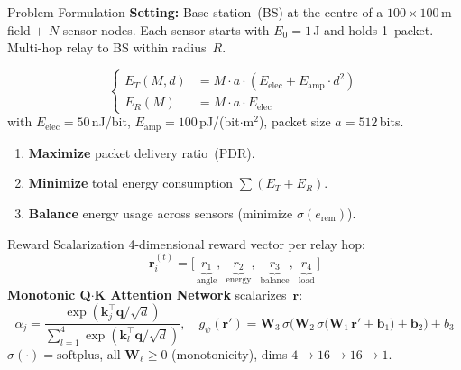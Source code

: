 \documentclass[final]{beamer}
\newlength{\colwidth}
\begin{document}
\begin{frame}[t]
\begin{columns}[t]
\begin{column}{\colwidth}
  \begin{block}{Problem Formulation}
    \textbf{Setting:} Base station~(BS) at the centre of a $100\!\times\!100$\,m field $+$ $N$ sensor nodes.
    Each sensor starts with $E_0=1$\,J and holds 1~packet.  Multi-hop relay to BS within radius~$R$.

    \begin{equation*}
    \left\{
    \begin{aligned}
      E_T(M,d) &= M \cdot a \cdot (E_{\text{elec}} + E_{\text{amp}} \cdot d^2) \\
      E_R(M) &= M \cdot a \cdot E_{\text{elec}}
    \end{aligned}
    \right.
    \end{equation*}
    with $E_{\text{elec}}=50$\,nJ/bit, $E_{\text{amp}}=100$\,pJ/(bit$\cdot$m$^2$), packet size $a=512$\,bits.

    \begin{enumerate}
      \item \textbf{Maximize} packet delivery ratio~(PDR).
      \item \textbf{Minimize} total energy consumption $\sum (E_T + E_R)$.
      \item \textbf{Balance} energy usage across sensors (minimize $\sigma(e_{\text{rem}})$).
    \end{enumerate}
  \end{block}

  \begin{block}{Reward Scalarization}
    4-dimensional reward vector per relay hop:
    \begin{equation*}
      \mathbf{r}_i^{(t)} = \bigl[\,\underbrace{r_1}_{\text{angle}},\;\underbrace{r_2}_{\text{energy}},\;\underbrace{r_3}_{\text{balance}},\;\underbrace{r_4}_{\text{load}}\,\bigr]
    \end{equation*}
    \textbf{Monotonic Q$\cdot$K Attention Network} scalarizes~$\mathbf{r}$:
    \begin{equation*}
      \alpha_j = \frac{\exp(\mathbf{k}_j^\top \mathbf{q}/\sqrt{d})}{\sum_{l=1}^{4}\exp(\mathbf{k}_l^\top \mathbf{q}/\sqrt{d})},
      \quad
      g_\psi(\mathbf{r}') = \mathbf{W}_3\,\sigma\!\bigl(\mathbf{W}_2\,\sigma\!\bigl(\mathbf{W}_1\,\mathbf{r}'+\mathbf{b}_1\bigr)+\mathbf{b}_2\bigr)+b_3
    \end{equation*}
    $\sigma(\cdot)=\text{softplus}$, all $\mathbf{W}_\ell\!\geq\!0$ (monotonicity), dims $4\!\to\!16\!\to\!16\!\to\!1$.


\end{block}
\end{column}
\end{columns}
\end{frame}
\end{document}
